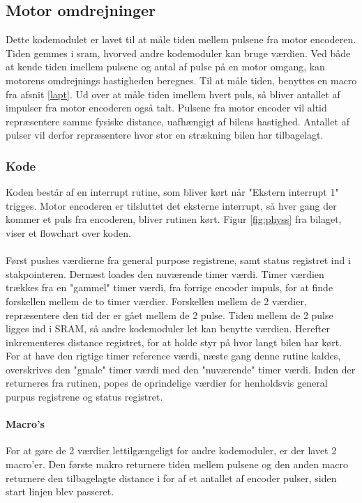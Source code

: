 \newpage

\subsection{Motor omdrejninger}
Dette kodemodulet er lavet til at måle tiden mellem pulsene fra motor encoderen. Tiden gemmes i sram, hvorved andre kodemoduler kan bruge værdien. Ved både at kende tiden imellem pulsene og antal af pulse på en motor omgang, kan motorens omdrejnings hastigheden beregnes. Til at måle tiden, benyttes en macro fra afsnit \ref{lapt}. Ud over at måle tiden imellem hvert puls, så bliver antallet af impulser fra motor encoderen også talt. Pulsene fra motor encoder vil altid repræsentere samme fysiske distance, uafhængigt af bilens hastighed. Antallet af pulser vil derfor repræsentere hvor stor en strækning bilen har tilbagelagt.  

\subsubsection{Kode}
Koden består af en interrupt rutine, som bliver kørt når "Ekstern interrupt 1" trigges. Motor encoderen er tilsluttet det eksterne interrupt, så hver gang der kommer et puls fra encoderen, bliver rutinen kørt. Figur \ref{fig:physs} fra bilaget, viser et flowchart over koden.\\
\\
Først pushes værdierne fra general purpose registrene, samt status registret ind i stakpointeren. Dernæst loades den nuværende timer værdi. Timer værdien trækkes fra en "gammel" timer værdi, fra forrige encoder impuls, for at finde forskellen mellem de to timer værdier. Forskellen mellem de 2 værdier, repræsentere den tid der er gået mellem de 2 pulse. Tiden mellem de 2 pulse ligges ind i SRAM, så andre kodemoduler let kan benytte værdien. Herefter inkrementeres distance registret, for at holde styr på hvor langt bilen har kørt. For at have den rigtige timer reference værdi, næste gang denne rutine kaldes, overskrives den "gmale" timer værdi med den "nuværende" timer værdi. Inden der returneres fra rutinen, popes de oprindelige værdier for henholdsvis general purpus registrene og status registret.

\paragraph{Macro's}
For at gøre de 2 værdier lettilgængeligt for andre kodemoduler, er der lavet 2 macro'er. Den første makro returnere tiden mellem pulsene og den anden macro returnere den tilbagelagte distance i for af et antallet af encoder pulser, siden start linjen blev passeret.